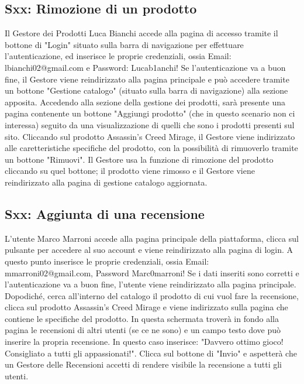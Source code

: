 \documentclass[12pt, a4paper, oneside]{book}
\begin{document}
    \subsection*{Sxx: Rimozione di un prodotto}
    Il Gestore dei Prodotti Luca Bianchi accede alla pagina di accesso tramite il bottone di "Login" situato sulla barra di navigazione per effettuare l'autenticazione, ed inserisce le proprie credenziali, ossia Email: lbianchi02@gmail.com e Password: Lucab1anchi!
    Se l'autenticazione va a buon fine, il Gestore viene reindirizzato alla pagina principale e può accedere tramite un bottone "Gestione catalogo" (situato sulla barra di navigazione) alla sezione apposita.
    Accedendo alla sezione della gestione dei prodotti, sarà presente una pagina contenente un bottone "Aggiungi prodotto" (che in questo scenario non ci interessa) seguito da una visualizzazione di quelli che sono i prodotti presenti sul sito.
    Cliccando sul prodotto Assassin's Creed Mirage, il Gestore viene indirizzato alle caretteristiche specifiche del prodotto, con la possibilità di rimuoverlo tramite un bottone "Rimuovi". Il Gestore usa la funzione di rimozione del prodotto cliccando su quel bottone; il prodotto viene rimosso e il Gestore viene reindirizzato alla pagina di gestione catalogo aggiornata.

    \subsection*{Sxx: Aggiunta di una recensione}
    L'utente Marco Marroni accede alla pagina principale della piattaforma, clicca sul pulsante per accedere al suo account e viene reindirizzato alla pagina di login. A questo punto inserisce le proprie credenziali, ossia Email: mmarroni02@gmail.com, Password Marc0marroni!
    Se i dati inseriti sono corretti e l'autenticazione va a buon fine, l'utente viene reindirizzato alla pagina principale.
    Dopodiché, cerca all'interno del catalogo il prodotto di cui vuol fare la recensione, clicca sul prodotto Assassin's Creed Mirage e viene indirizzato sulla pagina che contiene le specifiche del prodotto. In questa schermata troverà in fondo alla pagina le recensioni di altri utenti (se ce ne sono) e un campo testo dove può inserire la propria recensione. In questo caso inserisce: "Davvero ottimo gioco! Consigliato a tutti gli appassionati!". Clicca sul bottone di "Invio" e aspetterà che un Gestore delle Recensioni accetti di rendere visibile la recensione a tutti gli utenti.
\end{document}
